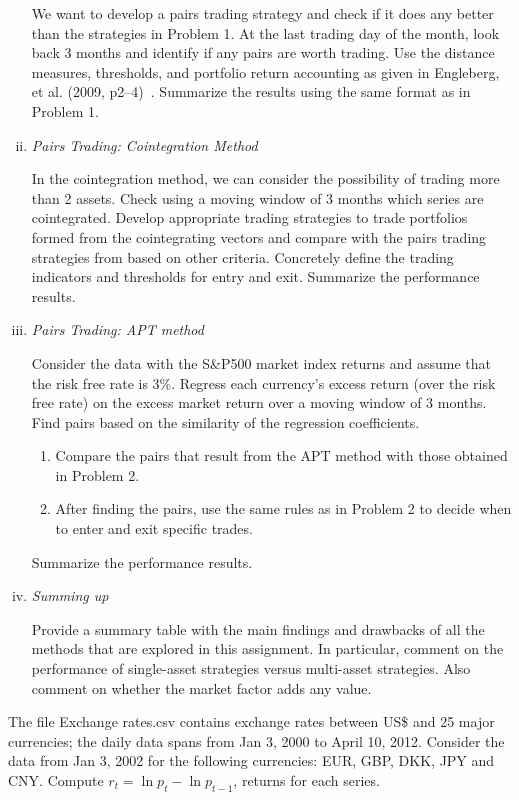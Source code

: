 \begin{enumerate}[(i)]
We want to develop a pairs trading strategy and check if it does any better than  the strategies in Problem 1. At the last trading day of the month, look back 3 months and identify if any pairs are worth trading. Use the distance measures, thresholds, and portfolio return accounting as given in Engleberg, et al. (2009, p2--4)~\cite{engelberg2009anatomy}. Summarize the results using the same format as in Problem 1.

	\item {\it Pairs Trading: Cointegration Method}

In the cointegration method, we can consider the possibility of trading more than 2 assets. Check using a moving window of 3 months which series are cointegrated. Develop appropriate trading strategies to trade portfolios formed from the cointegrating vectors and compare with the pairs trading strategies from based on other criteria. Concretely define the trading indicators and thresholds for entry and exit. Summarize the performance results.

	\item {\it Pairs Trading: APT method}

Consider the data with the S\&P500 market index returns and assume that the risk free rate is 3\%. Regress each currency's excess return (over the risk free rate) on the excess market return over a moving window of 3 months. Find pairs based on the similarity of the regression coefficients.
	\begin{enumerate}
	\item Compare the pairs that result from the APT method with those obtained in Problem 2.
	\item After finding the pairs, use the same rules as in Problem 2 to decide when to enter and exit specific trades.
	\end{enumerate}
Summarize the performance results.

	\item {\it Summing up}

Provide a summary table with the main findings and drawbacks of all the methods that are explored in this assignment. In particular, comment on the performance of single-asset strategies versus multi-asset strategies. Also comment on whether the market factor adds any value.
	\end{enumerate}







\prob The file Exchange rates.csv contains exchange rates between US\$ and 25 major currencies; the daily data spans from Jan 3, 2000 to April 10, 2012. Consider the data from Jan 3, 2002 for the following currencies: EUR, GBP, DKK, JPY and CNY. Compute $r_t = \ln{p_t} - \ln{p_{t-1}}$, returns for each series. \\


